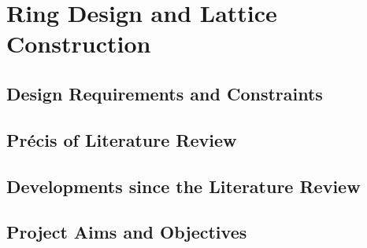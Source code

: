\chapter{Ring Design and Lattice Construction}
\section{Design Requirements and Constraints}

\section{Précis of Literature Review}

\section{Developments since the Literature Review}

\section{Project Aims and Objectives}
